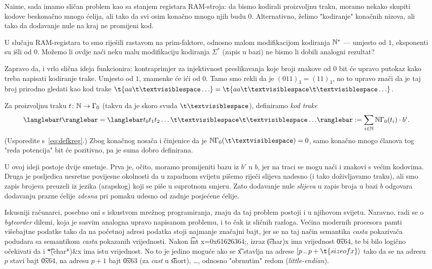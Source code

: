 Naime, sada imamo sličan problem kao sa stanjem registara RAM-stroja: da bismo kodirali proizvoljnu traku, moramo nekako skupiti kodove beskonačno mnogo ćelija, ali tako da svi osim konačno mnogo njih budu $0$. Alternativno, želimo "kodiranje" konačnih nizova, ali tako da dodavanje nule na kraj ne promijeni kod.

U slučaju RAM-registara to smo riješili rastavom na prim-faktore, odnosno malom modifikacijom kodiranja ${\mathbb N}^*$ --- umjesto od $1$, eksponenti su išli od $0$. Možemo li ovdje naći neku malu modifikaciju kodiranja $\Sigma^*$ (zapis u bazi) ne bismo li dobili analogni rezultat?

Zapravo da, i vrlo slična ideja funkcionira: kontraprimjer za injektivnost preslikavanja koje broji znakove od $0$ bit će upravo putokaz kako treba napisati kodiranje trake. Umjesto od $1$, znamenke će ići od $0$. Tamo smo rekli da je $(011)_3=(11)_3$, no to upravo znači da je taj broj prirodno gledati kao kod trake $\t{aa\bl\ldots}=\t{aa\bl\bl\ldots}$.

\begin{definicija}
Za proizvoljnu traku $t\colon{\mathbb N}\to\Gamma_0$ (takvu da je skoro svuda $\bl$), definiramo \emph{kod trake} \begin{equation}
    \knk{t}=\knk{t_0t_1t_2\ldots\bl\bl\ldots}:=\sum_{i\in\N}\N\Gamma_0(t_i)\cdot b^i\text.
\end{equation}
(Usporedite s~\eqref{eq:defkreg}.)
Zbog konačnog nosača i činjenice da je $\N\Gamma_0(\bl)=0$, samo konačno mnogo članova tog "reda potencija" bit će pozitivno, pa je suma dobro definirana.
\end{definicija}

U ovoj ideji postoje dvije smetnje. Prva je, očito, moramo promijeniti bazu iz $b'$ u $b$, jer na traci se mogu naći i znakovi s većim kodovima. Druga je posljedica nesretne povijesne okolnosti da u zapadnom svijetu pišemo riječi slijeva nadesno (i tako doživljavamo traku), ali smo zapis brojeva preuzeli iz jezika (arapskog) koji se piše u suprotnom smjeru. Zato dodavanje nule \emph{slijeva} u zapis broja u bazi $b$ odgovara dodavanju prazne ćelije \emph{zdesna} pri pomaku udesno od zadnje posjećene ćelije.

Iskusniji računarci, posebno oni s iskustvom mrežnog programiranja, znaju da taj problem postoji i u njihovom svijetu. Naravno, radi se o \emph{byteorder} dilemi, koja je sasvim analogna upravo napisanom problemu, i to čak iz sličnih razloga. Većina modernih procesora pamti višebajtne podatke tako da na početnoj adresi podatka stoji najmanje značajni bajt, jer se na taj način semantika \emph{casta} pokazivača podudara sa semantikom \emph{casta} pokazanih vrijednosti. Nakon \t{int x=0x61626364;}, izraz \t{(char)x} ima vrijednost \t{0x64}, te bi bilo logično očekivati da i \t{*(char*)\&x} ima istu vrijednost. No to je jedino moguće ako se \t x stavlja na adrese $[p\,..\,p+\t{sizeof x}\rangle$ tako da se na adresu $p$ stavi bajt \t{0x64}, na adresu $p+1$ bajt \t{0x63} (za \emph{cast} u \t{short}), \ldots, odnosno "obrnutim" redom (\emph{little-endian}).

